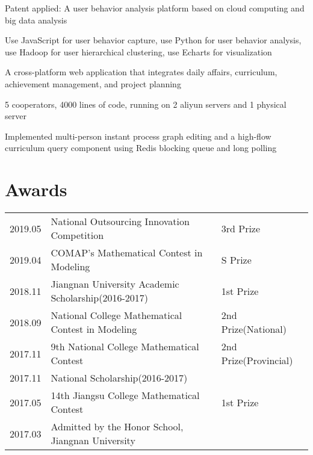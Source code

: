 \documentclass[]{deedy-resume-openfont}
\begin{document}
\begin{minipage}[t]{0.73\textwidth}
	\begin{tightemize}
		\item Patent applied: A user behavior analysis platform based on cloud computing and big data analysis
		\item Use JavaScript for user behavior capture,  use Python for user behavior analysis, use Hadoop for user hierarchical clustering, use Echarts for visualization
	\end{tightemize}
    \sectionsep
    
	\begin{tightemize}
		\item A cross-platform web application that integrates daily affairs, curriculum, achievement management, and project planning
		\item 5 cooperators, 4000 lines of code, running on 2 aliyun servers and 1 physical server
		\item Implemented multi-person instant process graph editing and a high-flow curriculum query component using Redis blocking queue and long polling
	\end{tightemize}
	\sectionsep

\section{Awards} 
\begin{tabular}{lll}
    2019.05 & National Outsourcing Innovation Competition & 3rd Prize \\
    2019.04 & COMAP's Mathematical Contest in Modeling & S Prize \\
    2018.11 & Jiangnan University Academic Scholarship(2016-2017) & 1st Prize \\
    2018.09 & National College Mathematical Contest in Modeling & 2nd Prize(National) \\
    2017.11 & 9th National College Mathematical Contest & 2nd Prize(Provincial) \\
    2017.11 & National Scholarship(2016-2017) & \\
    2017.05 & 14th Jiangsu College Mathematical Contest & 1st Prize\\
    2017.03 & Admitted by the Honor School, Jiangnan University& \\
\end{tabular}
\sectionsep


\end{minipage}
\end{document}
